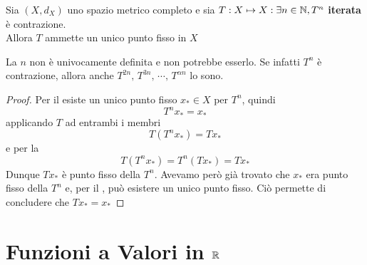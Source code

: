 \begin{theorem}
	\label{teo:teo_iterata_contraz}
	Sia $(X,d_X)$ uno spazio metrico completo e sia $T:X\mapsto X : \exists n \in \mathbb{N}, T^n$ \textbf{iterata} è contrazione.\\
	Allora $T$ ammette un unico punto fisso in $X$
	\begin{note}
		La $n$ non è univocamente definita e non potrebbe esserlo. Se infatti $T^n$ è contrazione, allora anche $T^{2n},\, T^{3n},\, \cdots,\, T^{\alpha n}$ lo sono.
	\end{note}
	\begin{proof}
		Per il  esiste un unico punto fisso $x_* \in X$ per $T^n$, quindi
		$$T^nx_* = x_*$$
		applicando $T$ ad entrambi i membri
		$$T(T^{n}x_*) = Tx_*$$
		e per la 
		$$T(T^{n}x_*) = T^n(Tx_*) = Tx_*$$
		Dunque $Tx_*$ è punto fisso della $T^n$. Avevamo però già trovato che $x_*$ era punto fisso della $T^n$ e, per il , può esistere un unico punto fisso. Ciò permette di concludere che $Tx_* = x_*$
	\end{proof}
\end{theorem}

\section{Funzioni a Valori in $\protect\mathbb{R}$}
